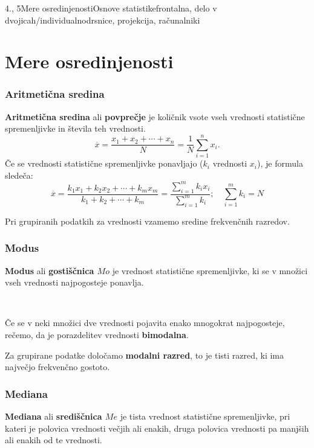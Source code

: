 \begin{priprava}{4., 5}{}{Mere osredinjenosti}{Osnove statistike}{frontalna, delo v dvojicah/individualno}{drsnice, projekcija, računalniki}

    \section{Mere osredinjenosti}

        

    \subsubsection{Aritmetična sredina}
        \textbf{Aritmetična sredina} ali \textbf{povprečje} je količnik vsote vseh vrednosti 
        statistične spremenljivke in števila teh vrednosti. \\

        $$\overline{x}=\dfrac{x_1+x_2+\cdots+x_n}{N}=\dfrac{1}{N}\sum_{i=1}^n x_i.$$
        Če se vrednosti statistične spremenljivke ponavljajo ($k_i$ vrednosti $x_i$), je formula sledeča:
        $$\overline{x}=\dfrac{k_1x_1+k_2x_2+\cdots+k_mx_m}{k_1+k_2+\cdots+k_m}=\dfrac{\sum_{i=1}^mk_ix_i}{\sum_{i=1}^mk_i}; \quad \sum_{i=1}^mk_i=N$$

       

    
        Pri grupiranih podatkih za vrednosti vzamemo sredine frekvenčnih razredov.
    




    \subsubsection{Modus}
        \textbf{Modus} ali \textbf{gostiščnica $Mo$} je vrednost statistične spremenljivke, ki se v množici vseh vrednosti najpogosteje ponavlja.                 
    
            ~
    
        Če se v neki množici dve vrednosti pojavita enako mnogokrat najpogosteje, rečemo, da je porazdelitev vrednosti \textbf{bimodalna}.
    

    
        Za grupirane podatke določamo \textbf{modalni razred}, to je tisti razred, ki ima največjo frekvenčno gostoto.
    



    \subsubsection{Mediana}
        \textbf{Mediana} ali \textbf{središčnica $Me$} je tista vrednost statistične spremenljivke, pri kateri je polovica vrednosti večjih ali enakih,
        druga polovica vrednosti pa manjših ali enakih od te vrednosti.                 
    

\end{priprava}

